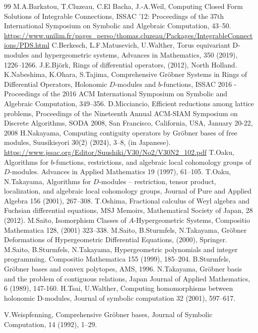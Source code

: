 \documentclass{article}
\begin{document}
\begin{thebibliography}{99}
%
M.A.Barkatou, T.Cluzeau, C.El Bacha, J.-A.Weil,
Computing Closed Form Solutions of Integrable Connections,
ISSAC '12: Proceedings of the 37th International Symposium on Symbolic and Algebraic Computation, 43--50. \\
\url{https://www.unilim.fr/pages_perso/thomas.cluzeau/Packages/IntegrableConnections/PDS.html}
%
 C.Berkesch, L.F.Matusevich, U.Walther, 
Torus equivariant D-modules and hypergeometric systems, 
Advances in Mathematics, 350 (2019), 1226--1266.
%
J.E.Bj\"ork, Rings of differential operators, (2012), North Holland.
%
K.Nabeshima, K.Ohara, S.Tajima, 
Comprehensive Gr\"{o}bner Systems in Rings of Differential Operators, 
Holonomic $D$-modules and $b$-functions,
ISSAC 2016 - Proceedings of the 2016 ACM International Symposium on Symbolic and Algebraic Computation,
349--356.
%
D.Micciancio, Efficient reductions among lattice problems, 
Proceedings of the Nineteenth Annual ACM-SIAM Symposium on Discrete Algorithms, SODA 2008, San Francisco, California, USA, January 20-22, 2008
%
H.Nakayama,  Computing contiguity operators by Gr\"{o}bner bases of free modules,  
Suusikisyori 30(2) (2024), 3--8, (in Japanese).
\url{https://www.jssac.org/Editor/Suushiki/V30/No2/V30N2_102.pdf}
%
T.Oaku,
Algorithms for $b$-functions,
restrictions, and algebraic local cohomology groups of $D$-modules.
Advances in Applied Mathematics 19 (1997), 61--105.
%
T.Oaku, N.Takayama,
Algorithms for $D$-modules -- restriction, tensor product, localization,
and algebraic local cohomology groups,
Journal of Pure and Applied Algebra
156 (2001), 267--308.
%
T.Oshima, Fractional calculus of Weyl algebra and Fuchsian differential equations, MSJ Memoirs, Mathematical Society of Japan, 28 (2012).
%
M.Saito, Isomorphism Classes of $A$-Hypergeometric Systems,
Compositio Mathematica 128, (2001) 323--338.
%
M.Saito, B.Sturmfels, N.Takayama,
Gr\"obner Deformations of Hypergeometric Differential Equations, (2000), Springer.
%
M.Saito, B.Sturmfels, N.Takayama,
Hypergeometric polynomials and integer programming.
Compositio Mathematica 155 (1999), 185--204. 
%
B.Sturmfels, Gr\"obner bases and convex polytopes,
AMS, 1996.
%
N.Takayama,
Gr\"obner basis and the problem of contiguous relations,  
Japan Journal of  Applied Mathematics, 
6 (1989), 147-160.
%
H.Tsai, U.Walther, 
Computing homomorphisms between holonomic D-modules,
Journal of symbolic computation 32 (2001),  597--617.

%
V.Weispfenning, 
Comprehensive Gr\"obner bases, 
Journal of Symbolic Computation, 14 (1992), 1--29. 
\end{thebibliography}
\end{document}
